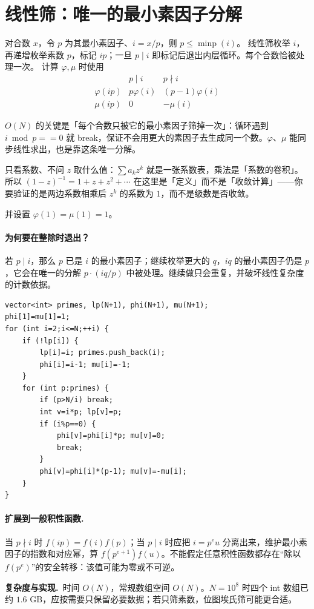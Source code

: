 \documentclass[UTF8,a4paper,11pt,oneside,openany,fontset=fandol]{ctexbook}
\theoremstyle{definition}
\newcommand{\cost}{\par\noindent\textbf{复杂度与实现.}\ }
\begin{document}
\section{线性筛：唯一的最小素因子分解}
对合数 $x$，令 $p$ 为其最小素因子、$i=x/p$，则 $p\le\operatorname{minp}(i)$。
线性筛枚举 $i$，再递增枚举素数 $p$，标记 $ip$；一旦 $p\mid i$ 即标记后退出内层循环。每个合数恰被处理一次。
计算 $\varphi,\mu$ 时使用
\[
\begin{array}{c|cc}
 &p\mid i&p\nmid i\\\hline
\varphi(ip)&p\varphi(i)&(p-1)\varphi(i)\\
\mu(ip)&0&-\mu(i)
\end{array}
\]

\begin{tip}
$O(N)$ 的关键是「每个合数只被它的最小素因子筛掉一次」：循环遇到 $i\bmod p==0$ 就 break，保证不会用更大的素因子去生成同一个数。$\varphi$、$\mu$ 能同步线性求出，也是靠这条唯一分解。
\end{tip}

\begin{tip}[「形式」两个字的含义]
只看系数、不问 $z$ 取什么值：$\sum a_kz^k$ 就是一张系数表，乘法是「系数的卷积」。所以 $(1-z)^{-1}=1+z+z^2+\cdots$ 在这里是「定义」而不是「收敛计算」——你要验证的是两边系数相乘后 $z^k$ 的系数为 $1$，而不是级数是否收敛。
\end{tip}

并设置 $\varphi(1)=\mu(1)=1$。


\paragraph{为何要在整除时退出？}
若 $p\mid i$，那么 $p$ 已是 $i$ 的最小素因子；继续枚举更大的 $q$，$iq$ 的最小素因子仍是 $p$，它会在唯一的分解 $p\cdot(iq/p)$ 中被处理。继续做只会重复，并破坏线性复杂度的计数依据。
\begin{lstlisting}
vector<int> primes, lp(N+1), phi(N+1), mu(N+1);
phi[1]=mu[1]=1;
for (int i=2;i<=N;++i) {
    if (!lp[i]) {
        lp[i]=i; primes.push_back(i);
        phi[i]=i-1; mu[i]=-1;
    }
    for (int p:primes) {
        if (p>N/i) break;
        int v=i*p; lp[v]=p;
        if (i%p==0) {
            phi[v]=phi[i]*p; mu[v]=0;
            break;
        }
        phi[v]=phi[i]*(p-1); mu[v]=-mu[i];
    }
}
\end{lstlisting}
\paragraph{扩展到一般积性函数.} 当 $p\nmid i$ 时 $f(ip)=f(i)f(p)$；当 $p\mid i$ 时应把 $i=p^e u$ 分离出来，维护最小素因子的指数和对应幂，算 $f(p^{e+1})f(u)$。不能假定任意积性函数都存在“除以 $f(p^e)$”的安全转移：该值可能为零或不可逆。
\cost 时间 $O(N)$，常规数组空间 $O(N)$。$N=10^8$ 时四个 int 数组已约 $1.6$ GB，应按需要只保留必要数据；若只筛素数，位图埃氏筛可能更合适。
\end{document}
